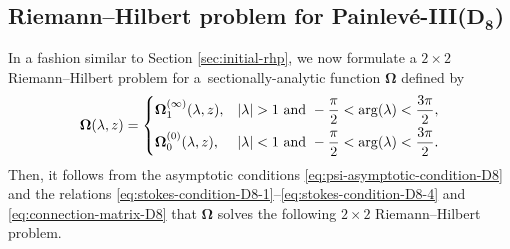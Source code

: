 \subsection[Riemann--Hilbert problem for Painlev\'e-III(D\_8)]{Riemann--Hilbert problem for Painlev\'e-III($\boldsymbol{D_8}$)} In a fashion similar to Section \ref{sec:initial-rhp}, we now formulate a $2\times 2$ Riemann--Hilbert problem for a~sectionally-analytic function ${\mathbf{\Omega}}$ defined by
\[
{\mathbf{\Omega}}(\lambda, z) =
 \begin{cases}
\mathbf \Omega_1^{(\infty)}(\lambda, z) , & |\lambda| >1 \ \text{and} \ -\dfrac{\pi}{2} < \arg (\lambda) < \dfrac{3\pi}{2}, \vspace{1mm}\\
\mathbf \Omega_0^{(0)}(\lambda, z) , & |\lambda| <1 \ \text{and} \ -\dfrac{\pi}{2} < \arg (\lambda) < \dfrac{3\pi}{2}.
\end{cases}
\]
Then, it follows from the asymptotic conditions \eqref{eq:psi-asymptotic-condition-D8} and the relations \eqref{eq:stokes-condition-D8-1}--\eqref{eq:stokes-condition-D8-4} and \eqref{eq:connection-matrix-D8} that $\mathbf{\Omega}$ solves the following $2 \times 2$ Riemann--Hilbert problem.
